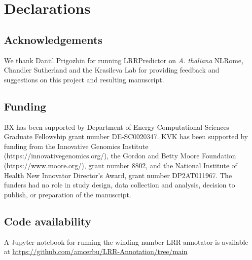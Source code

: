 \documentclass[authoryear]{article}
\begin{document}



\section*{Declarations}

\subsection*{Acknowledgements}
We thank Daniil Prigozhin for running LRRPredictor on \emph{A. thaliana} NLRome, Chandler Sutherland and the Krasileva Lab for providing feedback and suggestions on this project and resulting manuscript.

\subsection*{Funding}
BX has been supported by Department of Energy Computational Sciences Graduate Fellowship grant number DE-SC0020347. KVK has been supported by funding from the Innovative Genomics Institute (https://innovativegenomics.org/), the Gordon and Betty Moore Foundation
(https://www.moore.org/), grant number 8802, and the National Institute of Health New Innovator Director’s Award, grant number DP2AT011967. The funders had no role in study design, data collection and analysis, decision to publish, or preparation of the manuscript. 

\subsection*{Code availability}

A Jupyter notebook for running the winding number LRR annotator is available at \url{https://github.com/amcerbu/LRR-Annotation/tree/main}
\end{document}
